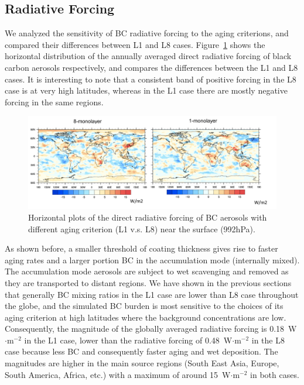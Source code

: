 \documentclass[12pt, fullpage]{uiucthesis2009_2}
\begin{document}
	
	\subsection{Radiative Forcing }
	We analyzed the sensitivity of BC radiative forcing to the aging criterions, and compared their differences between L1 and L8 cases. Figure~\ref{fig_P23} shows the horizontal distribution of the annually averaged direct radiative forcing of black carbon aerosols respectively, and compares the differences between the L1 and L8 cases. It is interesting to note that a consistent band of positive forcing in the L8 case is at very high latitudes, whereas in the L1 case there are mostly negative forcing in the same regions.
	\begin{figure}[h] 
		\begin{center}
			\includegraphics[width = 1\textwidth]{Figure23}
			\caption[Horizontal plots of the direct radiative forcing of BC aerosols with different aging criterion (L1 v.s. L8) near the surface (992hPa)]{\label{fig_P23} Horizontal plots of the direct radiative forcing of BC aerosols with different aging criterion (L1 v.s. L8) near the surface (992hPa).}
		\end{center}
	\end{figure}
	
	
	As shown before, a smaller threshold of coating thickness gives rise to faster aging rates and a larger portion BC in the accumulation mode (internally mixed). The accumulation mode aerosols are subject to wet scavenging and removed as they are transported to distant regions. We have shown in the previous sections that generally BC mixing ratios in the L1 case are lower than L8 case throughout the globe, and the simulated BC burden is most sensitive to the choices of its aging criterion at high latitudes where the background concentrations are low. Consequently, the magnitude of the globally averaged radiative forcing is 0.18~W$\cdot{\text{m}^{-2}}$ in the L1 case, lower than the radiative forcing of 0.48~W$\cdot{\text{m}^{-2}}$ in the L8 case because less BC and consequently faster aging and wet deposition. The magnitudes are higher in the main source regions (South East Asia, Europe, South America, Africa, etc.) with a maximum of around 15~W$\cdot{\text{m}^{-2}}$ in both cases. 
	
\end{document}
